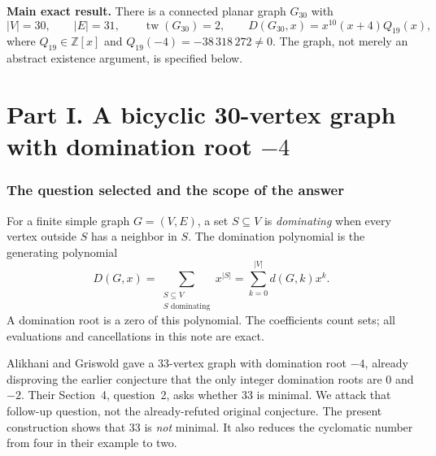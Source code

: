 \documentclass[11pt]{article}
\numberwithin{equation}{section}
\theoremstyle{definition}
\newcommand{\D}{D}
\newcommand{\Z}{\mathbb{Z}}
\newcommand{\Gthirty}{G_{30}}
\newcommand{\tw}{\operatorname{tw}}
\begin{document}
\begin{resultbox}
\textbf{Main exact result.}
There is a connected planar graph \(\Gthirty\) with
\[
 |V|=30,\qquad |E|=31,\qquad \tw(\Gthirty)=2,\qquad
 \D(\Gthirty,x)=x^{10}(x+4)Q_{19}(x),
\]
where \(Q_{19}\in\Z[x]\) and \(Q_{19}(-4)=-38\,318\,272\ne0\).
The graph, not merely an abstract existence argument, is specified below.
\end{resultbox}

{\small\setlength{\parskip}{0pt}\tableofcontents}

\part*{Part I.\texorpdfstring{\quad}{} A bicyclic 30-vertex graph with domination root \texorpdfstring{\(-4\)}{-4}}

\section{The question selected and the scope of the answer}

For a finite simple graph \(G=(V,E)\), a set \(S\subseteq V\) is
\emph{dominating} when every vertex outside \(S\) has a neighbor in \(S\).
The domination polynomial is the generating polynomial
\begin{equation}\label{eq:def}
 \D(G,x)=\sum_{\substack{S\subseteq V\\S\text{ dominating}}}x^{|S|}
        =\sum_{k=0}^{|V|}d(G,k)x^k.
\end{equation}
A domination root is a zero of this polynomial. The coefficients count
sets; all evaluations and cancellations in this note are exact.

Alikhani and Griswold \cite{AG} gave a 33-vertex graph with domination
root \(-4\), already disproving the earlier conjecture that the only
integer domination roots are \(0\) and \(-2\). Their Section~4, question~2,
asks whether 33 is minimal. We attack that follow-up question, not the
already-refuted original conjecture. The present construction shows that
33 is \emph{not} minimal. It also reduces the cyclomatic number from four
in their example to two.
\end{document}
